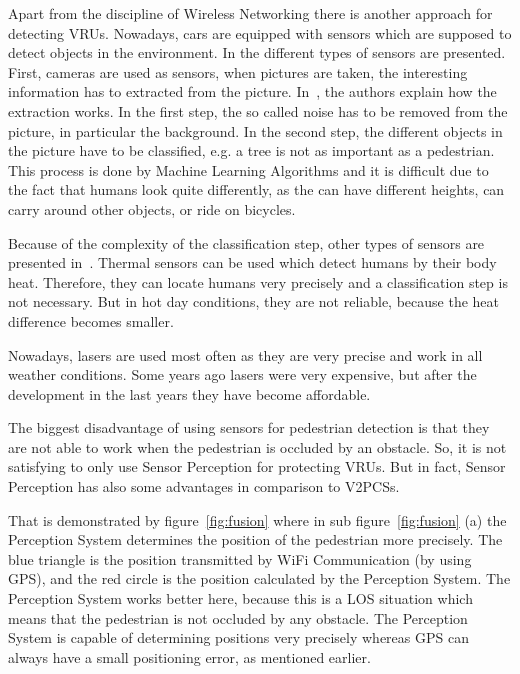 \documentclass[]{ccs-thesis}
\begin{document}
Apart from the discipline of Wireless Networking there is another approach for detecting \acp{VRU}. Nowadays, cars are equipped with sensors which are supposed to detect objects in the environment. In \cite{survey} the different types of sensors are presented. First, cameras are used as sensors, when pictures are taken, the interesting information has to extracted from the picture. In~\cite{2010perception}, the authors explain how the extraction works. In the first step, the so called noise has to be removed from the picture, in particular the background. In the second step, the different objects in the picture have to be classified, e.g. a tree is not as important as a pedestrian. This process is done by Machine Learning Algorithms and it is difficult due to the fact that humans look quite differently, as the can have different heights, can carry around other objects, or ride on bicycles. 

Because of the complexity of the classification step, other types of sensors are presented in~\cite{survey}. Thermal sensors can be used which detect humans by their body heat. Therefore, they can locate humans very precisely and a classification step is not necessary. But in hot day conditions, they are not reliable, because the heat difference becomes smaller.

Nowadays, lasers are used most often as they are very precise and work in all weather conditions. Some years ago lasers were very expensive, but after the development in the last years they have become affordable.

The biggest disadvantage of using sensors for pedestrian detection is that they are not able to work when the pedestrian is occluded by an obstacle. So, it is not satisfying to only use Sensor Perception for protecting \acp{VRU}. But in fact, Sensor Perception has also some advantages in comparison to \acp{V2PCS}. 

That is demonstrated by figure~\ref{fig:fusion} where in sub figure~\ref{fig:fusion} (a) the Perception System determines the position of the pedestrian more precisely. The blue triangle is the position transmitted by WiFi Communication (by using GPS), and the red circle is the position calculated by the Perception System. The Perception System works better here, because this is a \ac{LOS} situation which means that the pedestrian is not occluded by any obstacle. The Perception System is capable of determining positions very precisely whereas GPS can always have a small positioning error, as mentioned earlier.
\end{document}
